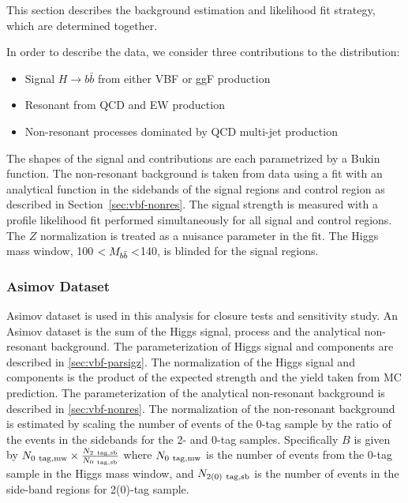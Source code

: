 \label{sec:vbf-parsigz}

This section describes the background estimation and likelihood fit strategy, which are determined together.

In order to describe the data, we consider three contributions to the \Mbb{} distribution:  
\begin{itemize}
  \item Signal $H\rightarrow b \bar b$ from either VBF or ggF production
  \item Resonant \zjets{} from QCD and EW production
  \item Non-resonant processes dominated by QCD multi-jet production
\end{itemize}

The shapes of the signal and \zjets{} contributions are each parametrized by a Bukin function. The non-resonant background is taken from data using a fit with an analytical function in the \Mbb{} sidebands of the signal regions and control region as described in Section~\ref{sec:vbf-nonres}.
The signal strength is measured with a profile likelihood fit performed
simultaneously for all signal and control regions.  The $Z$ normalization is treated as a nuisance parameter in the fit.  The Higgs mass window, 100 \GeV$<M_{b\bar{b}}<$140\GeV, is blinded for the signal regions.  

\subsubsection{Asimov Dataset}
\label{sec:vbf-asimov}
Asimov dataset is used in this analysis for closure tests and sensitivity study. An Asimov dataset is the sum of the Higgs signal, \zjets{} process and the analytical non-resonant background. The parameterization of Higgs signal and \zjets{} components are described in \ref{sec:vbf-parsigz}. The normalization of the Higgs signal and \zjets{} components is the product of the expected strength and the yield taken from MC prediction. The parameterization of the analytical non-resonant background is described in \ref{sec:vbf-nonres}. The normalization of the non-resonant background is estimated by scaling the number of events of the 0-tag sample by the ratio of the events in the sidebands for the 2- and 0-tag samples. Specifically $B$ is given by $N_{\rm 0~tag, mw}\times \frac{N_{\rm 2~tag, sb}}{N_{\rm 0~tag, sb}}$ where  $N_{\rm 0~tag, mw}$ is the number of events from the 0-tag sample in the Higgs mass window, and $N_{\rm 2(0)~tag, sb}$ is the number of events in the side-band regions for 2(0)-tag sample.

